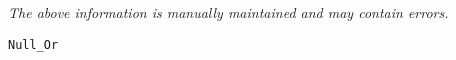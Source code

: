 \label{pkg:null\_or}

{\tiny \it The above information is manually maintained and may contain errors.}
\begin{verbatim}
Null_Or
\end{verbatim}
